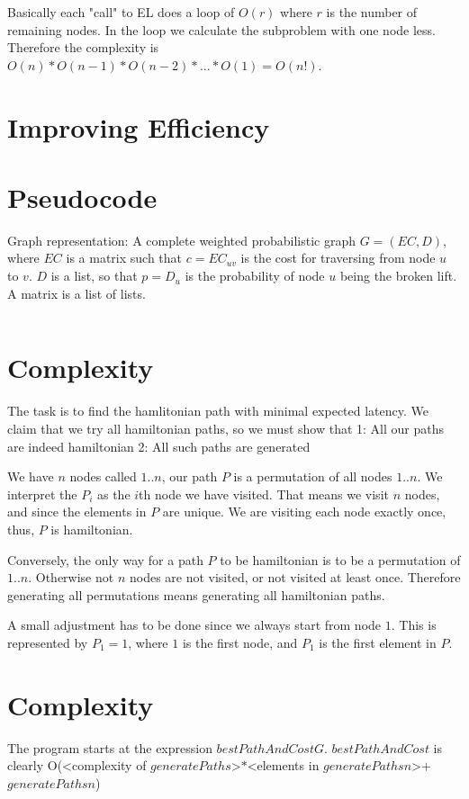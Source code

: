 \documentclass[a4paper,11pt]{article}
\begin{document}
Basically each "call" to EL does a loop of $O(r)$ where
$r$ is the number of remaining nodes. In the loop
we calculate the subproblem with one node less.
Therefore the complexity is $O(n)*O(n-1)*O(n-2)*...*O(1) = O(n!)$.



\section{Improving Efficiency}

\section{Pseudocode}
Graph representation: A complete weighted probabilistic graph $G = (EC, D)$, where $EC$ is a
matrix such that $c = EC_{uv}$ is the cost for traversing from node $u$ to $v$.
$D$ is a list, so that $p = D_u$ is the probability of node $u$ being the broken lift.
A matrix is a list of lists.

\begin{lstlisting}[mathescape]
\end{lstlisting}

\section{Complexity}
The task is to find the hamlitonian path with minimal expected latency.
We claim that we try all hamiltonian paths, so we must show that
1: All our paths are indeed hamiltonian
2: All such paths are generated

We have $n$ nodes called $1..n$, our path $P$ is a permutation of all nodes $1..n$.
We interpret the $P_i$ as the $i$th node we have visited.
That means we visit $n$ nodes, and since the elements in $P$ are unique.
We are visiting each node exactly once, thus, $P$ is hamiltonian.

Conversely, the only way for a path $P$ to be hamiltonian is to be a permutation of $1..n$.
Otherwise not $n$ nodes are not visited, or not visited at least once.
Therefore generating all permutations means generating all hamiltonian paths.

A small adjustment has to be done since we always start from node $1$.
This is represented by $P_1 = 1$, where $1$ is the first node, and $P_1$ is
the first element in $P$.

\section{Complexity}
The program starts at the expression $bestPathAndCost G$.
$bestPathAndCost$ is clearly
O(<complexity of $generatePaths$>$*$<elements in $generatePaths n$>$+$ $generatePaths n$)
\end{document}
